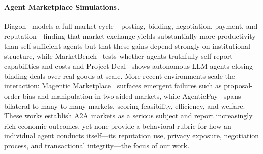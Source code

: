 \documentclass{article} %
\begin{document}
\paragraph{Agent Marketplace Simulations.}
Diagon~\citep{diagon} models a full market cycle---posting, bidding, negotiation, payment, and reputation---finding that market exchange yields substantially more productivity than self-sufficient agents but that these gains depend strongly on institutional structure, while MarketBench~\citep{marketbench} tests whether agents truthfully self-report capabilities and costs and Project Deal~\citep{projectdeal2025} shows autonomous LLM agents closing binding deals over real goods at scale. More recent environments scale the interaction: Magentic Marketplace~\citep{bansal2025magenticmarketplaceopensourceenvironment} surfaces emergent failures such as proposal-order bias and manipulation in two-sided markets, while AgenticPay~\citep{liu2026agenticpaymultiagentllmnegotiation} spans bilateral to many-to-many markets, scoring feasibility, efficiency, and welfare. These works establish A2A markets as a serious subject and report increasingly rich economic outcomes, yet none provide a behavioral rubric for how an individual agent conducts itself---its reputation use, privacy exposure, negotiation process, and transactional integrity---the focus of our work.
\end{document}
